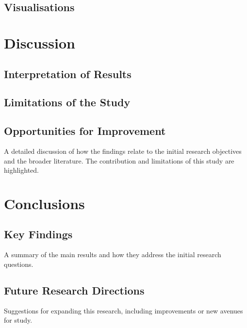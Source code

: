 \documentclass[a4paper,12pt]{report}
\begin{document}
\section{Visualisations}\label{sec:results:viz}

\chapter{Discussion}

\section{Interpretation of Results}

\section{Limitations of the Study}

\section{Opportunities for Improvement}


A detailed discussion of how the findings relate to the initial research objectives and the broader literature. The contribution and limitations of this study are highlighted.

\chapter{Conclusions}

\section{Key Findings}
A summary of the main results and how they address the initial research questions.

\section{Future Research Directions}
Suggestions for expanding this research, including improvements or new avenues for study.
\end{document}
